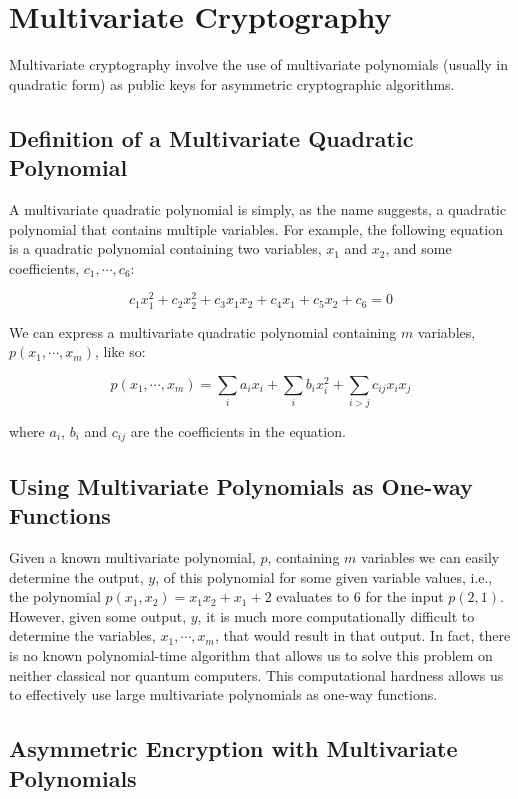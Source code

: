 \documentclass[journal]{IEEEtran}
\begin{document}
\section{Multivariate Cryptography}

Multivariate cryptography involve the use of multivariate polynomials (usually in quadratic form) as public keys for asymmetric cryptographic algorithms.

\subsection{Definition of a Multivariate Quadratic Polynomial}

A multivariate quadratic polynomial is simply, as the name suggests, a quadratic polynomial that contains multiple variables. For example, the following equation is a quadratic polynomial containing two variables, $x_1$ and $x_2$, and some coefficients, $c_1, \cdots, c_6$:

$$c_1x_1^2 + c_2x_2^2 + c_3x_1x_2 + c_4x_1 + c_5x_2 + c_6 = 0$$

We can express a multivariate quadratic polynomial containing $m$ variables, $p(x_1, \cdots, x_m)$, like so:

$$p(x_1, \cdots, x_m) = \sum_i a_i x_i + \sum_i b_i x_i^2 + \sum_{i > j} c_{ij} x_i x_j$$

where $a_i$, $b_i$ and $c_{ij}$ are the coefficients in the equation.

\subsection{Using Multivariate Polynomials as One-way Functions}

Given a known multivariate polynomial, $p$, containing $m$ variables we can easily determine the output, $y$, of this polynomial for some given variable values, i.e., the polynomial $p(x_1, x_2) = x_1 x_2 + x_1 + 2$ evaluates to 6 for the input $p(2, 1)$. However, given some output, $y$, it is much more computationally difficult to determine the variables, $x_1, \cdots, x_m$, that would result in that output. In fact, there is no known polynomial-time algorithm that allows us to solve this problem on neither classical nor quantum computers. This computational hardness allows us to effectively use large multivariate polynomials as one-way functions\cite{multivar:ding}.

\subsection{Asymmetric Encryption with Multivariate Polynomials}
\end{document}
